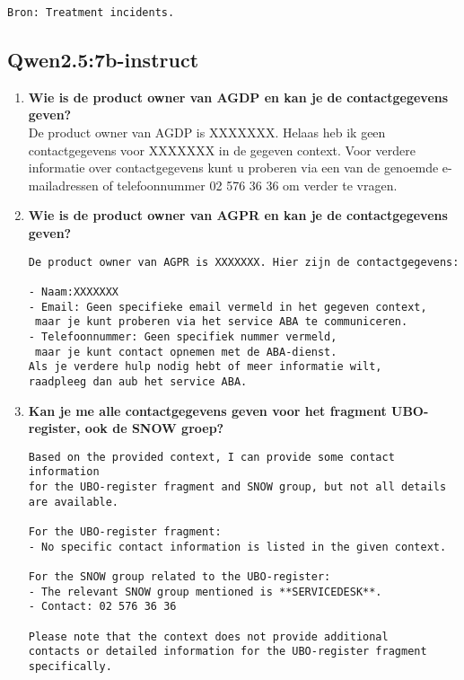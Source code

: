 \begin{enumerate}
\begin{verbatim}
Bron: Treatment incidents.
    \end{verbatim}
\end{enumerate}

\subsection{Qwen2.5:7b-instruct}
\begin{enumerate}
    \item \textbf{Wie is de product owner van AGDP en kan je de contactgegevens geven?} \\
    De product owner van AGDP is XXXXXXX.
    Helaas heb ik geen contactgegevens voor XXXXXXX in de gegeven context. Voor verdere informatie over contactgegevens kunt u proberen via een van de genoemde e-mailadressen of telefoonnummer 02 576 36 36 om verder te vragen.
    
    \item \textbf{Wie is de product owner van AGPR en kan je de contactgegevens geven?} \\
    \begin{verbatim}
De product owner van AGPR is XXXXXXX. Hier zijn de contactgegevens:

- Naam:XXXXXXX
- Email: Geen specifieke email vermeld in het gegeven context,
 maar je kunt proberen via het service ABA te communiceren.
- Telefoonnummer: Geen specifiek nummer vermeld,
 maar je kunt contact opnemen met de ABA-dienst.
Als je verdere hulp nodig hebt of meer informatie wilt, 
raadpleeg dan aub het service ABA.
    \end{verbatim}
    
    \item \textbf{Kan je me alle contactgegevens geven voor het fragment UBO-register, ook de SNOW groep?} \\
    \begin{verbatim}
Based on the provided context, I can provide some contact information 
for the UBO-register fragment and SNOW group, but not all details are available.

For the UBO-register fragment:
- No specific contact information is listed in the given context.

For the SNOW group related to the UBO-register:
- The relevant SNOW group mentioned is **SERVICEDESK**. 
- Contact: 02 576 36 36

Please note that the context does not provide additional 
contacts or detailed information for the UBO-register fragment specifically.


\end{verbatim}
\end{enumerate}
